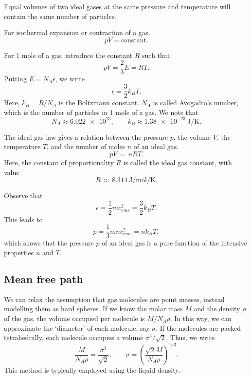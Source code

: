 \documentclass[11pt]{article}
\theoremstyle{definition}
\theoremstyle{remark}
\numberwithin{equation}{section}
\begin{document}
    \begin{theorem}
        Equal volumes of two ideal gases at the same pressure and temperature will
        contain the same number of particles.
    \end{theorem}

    \begin{theorem}
        For isothermal expansion or contraction of a gas, \[
            pV = \text{constant}.
        \] 
    \end{theorem}

    For 1 mole of a gas, introduce the constant $R$ such that \[
        pV = \frac{2}{3}E = RT.
    \] Putting $E = N_A\epsilon$, we write \[
        \epsilon = \frac{3}{2}k_B T.
    \] Here, $k_B = R / N_A$ is the Boltzmann constant. $N_A$ is called Avogadro's
    number, which is the number of particles in 1 mole of a gas. We note that \[
        N_A \approx \num{6.022e23}, \qquad 
        k_B \approx \SI{1.38e-23}{\joule\per\kelvin}.
    \] 

    \begin{theorem}
        The ideal gas law gives a relation between the pressure $p$, the volume $V$,
        the temperature $T$, and the number of moles $n$ of an ideal gas.
        \[
            pV \,=\, nRT.
        \]
        Here, the constant of proportionality $R$ is called the ideal gas constant,
        with value \[
            R \,\approx\, \SI{8.314}{\joule\per\mole\per\kelvin}.
        \]
    \end{theorem}

    Observe that \[
        \epsilon = \frac{1}{2}m c_{rms}^2 = \frac{3}{2}k_B T.
    \] This leads to \[
        p = \frac{1}{3}mn c_{rms}^2 = n k_B T,
    \] which shows that the pressure $p$ of an ideal gas is a pure function of the
    intensive properties $n$ and $T$.

    \subsection{Mean free path}
    We can relax the assumption that gas molecules are point masses, instead
    modelling them as hard spheres. If we know the molar mass $M$ and the density
    $\rho$ of the gas, the volume occupied per molecule is $M / N_A\rho$.
    In this way, we can approximate the `diameter' of each molecule, say $\sigma$.
    If the molecules are packed tetrahedrally, each molecule occupies a volume
    $\sigma^3 / \sqrt{2}$. Thus, we write \[
        \frac{M}{N_A \rho} = \frac{\sigma^3}{\sqrt{2}}, \qquad
        \sigma = \left(\frac{\sqrt{2} M}{ N_A \rho}\right)^{1 /3}.
    \] This method is typically employed using the liquid density.
\end{document}
